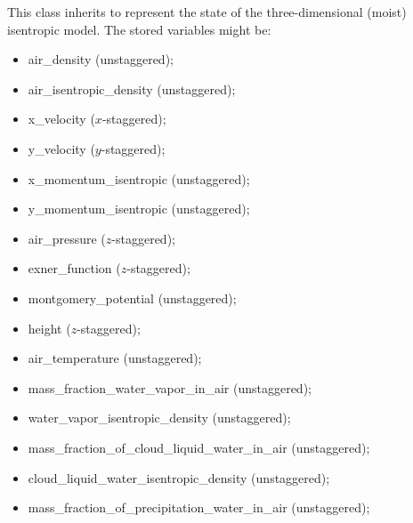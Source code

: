 \documentclass[letterpaper,10pt,english]{sphinxmanual}
\begin{document}
\begin{fulllineitems}
\label{\detokenize{api:storages.state_isentropic.StateIsentropic}}
This class inherits {\hyperref[\detokenize{api:storages.grid_data.GridData}]{}} to represent the state of the three-dimensional
(moist) isentropic model. The stored variables might be:
\begin{itemize}
\item {} 
air\_density (unstaggered);

\item {} 
air\_isentropic\_density (unstaggered);

\item {} 
x\_velocity (\(x\)-staggered);

\item {} 
y\_velocity (\(y\)-staggered);

\item {} 
x\_momentum\_isentropic (unstaggered);

\item {} 
y\_momentum\_isentropic (unstaggered);

\item {} 
air\_pressure (\(z\)-staggered);

\item {} 
exner\_function (\(z\)-staggered);

\item {} 
montgomery\_potential (unstaggered);

\item {} 
height (\(z\)-staggered);

\item {} 
air\_temperature (unstaggered);

\item {} 
mass\_fraction\_water\_vapor\_in\_air (unstaggered);

\item {} 
water\_vapor\_isentropic\_density (unstaggered);

\item {} 
mass\_fraction\_of\_cloud\_liquid\_water\_in\_air (unstaggered);

\item {} 
cloud\_liquid\_water\_isentropic\_density (unstaggered);

\item {} 
mass\_fraction\_of\_precipitation\_water\_in\_air (unstaggered);


\end{itemize}
\end{fulllineitems}
\end{document}
